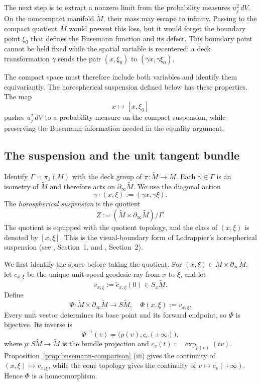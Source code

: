 \documentclass[12pt]{amsart}
\theoremstyle{definition}
\numberwithin{equation}{section}
\newcommand{\wti}{\widetilde}
\begin{document}
The next step is to extract a nonzero limit from the probability measures
\(u_j^2\,dV\).  On the noncompact manifold \(\wti M\), their mass may
escape to infinity.  Passing to the compact quotient \(M\) would prevent
this loss, but it would forget the boundary point \(\xi_0\) that defines
the Busemann function and its defect.  This boundary point cannot be held
fixed while the spatial variable is recentered: a deck transformation
\(\gamma\) sends the pair \((x,\xi_0)\) to
\((\gamma x,\gamma\xi_0)\).

The compact space must therefore include both variables and identify them
equivariantly.  The horospherical suspension defined below has these
properties.  The map
\[
  x\longmapsto[x,\xi_0]
\]
pushes \(u_j^2\,dV\) to a probability measure on the compact suspension,
while preserving the Busemann information needed in the equality
argument.

\subsection{The suspension and the unit tangent bundle}

Identify \(\Gamma=\pi_1(M)\) with the deck group of
\(\pi\colon\wti M\to M\).  Each \(\gamma\in\Gamma\) is an isometry of
\(\wti M\) and therefore acts on \(\partial_\infty\wti M\).  We use the
diagonal action
\[
  \gamma\cdot(x,\xi):=(\gamma x,\gamma\xi).
\]
The \emph{horospherical suspension} is the quotient
\begin{equation}\label{eq:suspension}
  Z
  :=
  (\wti M\times\partial_\infty\wti M)/\Gamma.
\end{equation}
The quotient is equipped with the quotient topology, and the class of
\((x,\xi)\) is denoted by \([x,\xi]\).  This is the visual-boundary form
of Ledrappier's horospherical suspension (see
\cite{Ledrappier2010}, Section~1, and
\cite{LedrappierWang2010}, Section~2).

We first identify the space before taking the quotient.  For
\((x,\xi)\in\wti M\times\partial_\infty\wti M\), let \(c_{x,\xi}\) be
the unique unit-speed geodesic ray from \(x\) to \(\xi\), and let
\[
  v_{x,\xi}:=\dot c_{x,\xi}(0)\in S_x\wti M.
\]
Define
\[
  \Phi\colon
  \wti M\times\partial_\infty\wti M
  \longrightarrow S\wti M,
  \quad
  \Phi(x,\xi):=v_{x,\xi}.
\]
Every unit vector determines its base point and its forward endpoint, so
\(\Phi\) is bijective.  Its inverse is
\[
  \Phi^{-1}(v)
  =
  \bigl(p(v),c_v(+\infty)\bigr),
\]
where \(p\colon S\wti M\to\wti M\) is the bundle projection and
\(c_v(t):=\exp_{p(v)}(tv)\).  Proposition~\ref{prop:busemann-comparison}
\textup{(iii)} gives the continuity of
\((x,\xi)\mapsto v_{x,\xi}\), while the cone topology gives the
continuity of \(v\mapsto c_v(+\infty)\).  Hence \(\Phi\) is a
homeomorphism.
\end{document}
